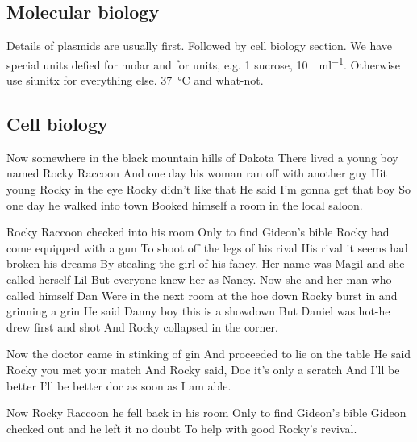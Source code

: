\documentclass[vruler,JCS]{COB}
\begin{document}
\subsection{Molecular biology}

Details of plasmids are usually first.
Followed by cell biology section.
We have special units defied for molar and for units, e.g. \SI{1}{\Molar} sucrose, \SI{10}{\Units\per\milli\litre}.
Otherwise use siunitx for everything else. \SI{37}{\degreeCelsius} and what-not.

\subsection{Cell biology}

Now somewhere in the black mountain hills of Dakota
There lived a young boy named Rocky Raccoon
And one day his woman ran off with another guy
Hit young Rocky in the eye Rocky didn’t like that
He said I’m gonna get that boy
So one day he walked into town
Booked himself a room in the local saloon.

Rocky Raccoon checked into his room
Only to find Gideon’s bible
Rocky had come equipped with a gun
To shoot off the legs of his rival
His rival it seems had broken his dreams
By stealing the girl of his fancy.
Her name was Magil and she called herself Lil
But everyone knew her as Nancy.
Now she and her man who called himself Dan
Were in the next room at the hoe down
Rocky burst in and grinning a grin
He said Danny boy this is a showdown
But Daniel was hot-he drew first and shot
And Rocky collapsed in the corner.

Now the doctor came in stinking of gin
And proceeded to lie on the table
He said Rocky you met your match
And Rocky said, Doc it’s only a scratch
And I’ll be better I’ll be better doc as soon as I am able.

Now Rocky Raccoon he fell back in his room
Only to find Gideon’s bible
Gideon checked out and he left it no doubt
To help with good Rocky’s revival.






\end{document}
